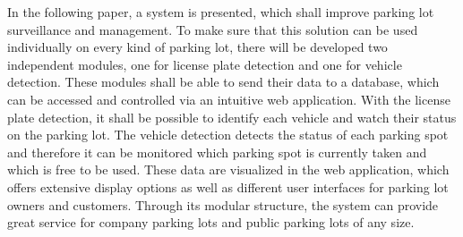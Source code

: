 In the following paper, a system is presented, which shall improve parking lot
surveillance and management. To make sure that this solution can be used
individually on every kind of parking lot, there will be developed two
independent modules, one for license plate detection and one for vehicle
detection. These modules shall be able to send their data to a database, which
can be accessed and controlled via an intuitive web application. With the
license plate detection, it shall be possible to identify each vehicle and watch
their status on the parking lot. The vehicle detection detects the status of
each parking spot and therefore it can be monitored which parking spot is
currently taken and which is free to be used. These data are visualized in the
web application, which offers extensive display options as well as different
user interfaces for parking lot owners and customers. Through its modular
structure, the system can provide great service for company parking lots and
public parking lots of any size.